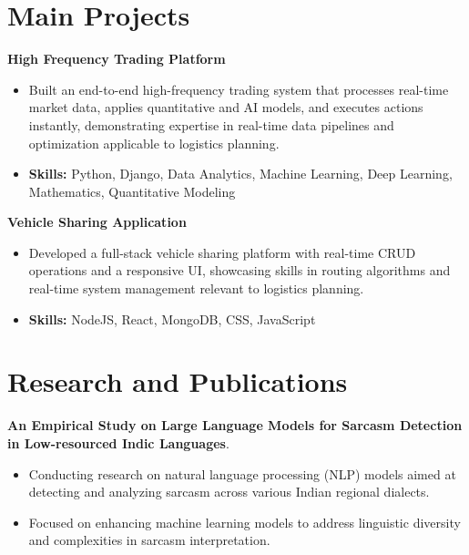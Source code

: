 \documentclass[a4paper,11pt]{article}
\begin{document}
\section{\textbf{Main Projects}}

\vspace{1mm}
  \textbf{High Frequency Trading Platform  }
\vspace{-1.5mm} %
\begin{itemize}
  \item Built an end-to-end high-frequency trading system that processes real-time market data, applies quantitative and AI models, and executes actions instantly, demonstrating expertise in real-time data pipelines and optimization applicable to logistics planning.
\vspace{-3mm}
  \item \textbf{Skills:} Python, Django, Data Analytics, Machine Learning, Deep Learning, Mathematics, Quantitative Modeling
\end{itemize}


\vspace{1mm}
   \textbf{Vehicle Sharing Application }
\vspace{-1.5mm} %
\begin{itemize}
  \item Developed a full-stack vehicle sharing platform with real-time CRUD operations and a responsive UI, showcasing skills in routing algorithms and real-time system management relevant to logistics planning.
\vspace{-3mm}
  \item \textbf{Skills:} NodeJS, React, MongoDB, CSS, JavaScript
\end{itemize}



\section{\textbf{Research and Publications} \hfill }
\vspace{1mm}
  \textbf{An Empirical Study on Large Language Models for Sarcasm Detection in Low-resourced Indic Languages}.
\vspace{-1mm} %
\begin{itemize}
  \item Conducting research on natural language processing (NLP) models aimed at detecting and analyzing sarcasm across various Indian regional dialects.
\vspace{-3mm}
  \item Focused on enhancing machine learning models to address linguistic diversity and complexities in sarcasm interpretation.
\end{itemize}
\end{document}
